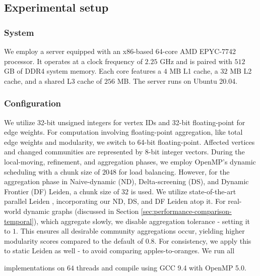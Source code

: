 \subsection{Experimental setup}
\label{sec:setup}

\subsubsection{System}
\label{sec:system}

We employ a server equipped with an x86-based 64-core AMD EPYC-7742 processor. It operates at a clock frequency of $2.25$ GHz and is paired with $512$ GB of DDR4 system memory. Each core features a $4$ MB L1 cache, a $32$ MB L2 cache, and a shared L3 cache of $256$ MB. The server runs on Ubuntu 20.04.


\subsubsection{Configuration}
\label{sec:configuration}




We utilize 32-bit unsigned integers for vertex IDs and 32-bit floating-point for edge weights. For computation involving floating-point aggregation, like total edge weights and modularity, we switch to 64-bit floating-point. Affected vertices and changed communities are represented by 8-bit integer vectors. During the local-moving, refinement, and aggregation phases, we employ OpenMP's dynamic scheduling with a chunk size of $2048$ for load balancing. However, for the aggregation phase in Naive-dynamic (ND), Delta-screening (DS), and Dynamic Frontier (DF) Leiden, a chunk size of $32$ is used. We utilize state-of-the-art parallel Leiden \cite{sahu2024fast}, incorporating our ND, DS, and DF Leiden atop it. For real-world dynamic graphs (discussed in Section \ref{sec:performance-comparison-temporal}), which aggregate slowly, we disable aggregation tolerance - setting it to $1$. This ensures all desirable community aggregations occur, yielding higher modularity scores compared to the default of $0.8$. For consistency, we apply this to static Leiden as well - to avoid comparing apples-to-oranges. We run all implementations on $64$ threads and compile using GCC 9.4 with OpenMP 5.0.

